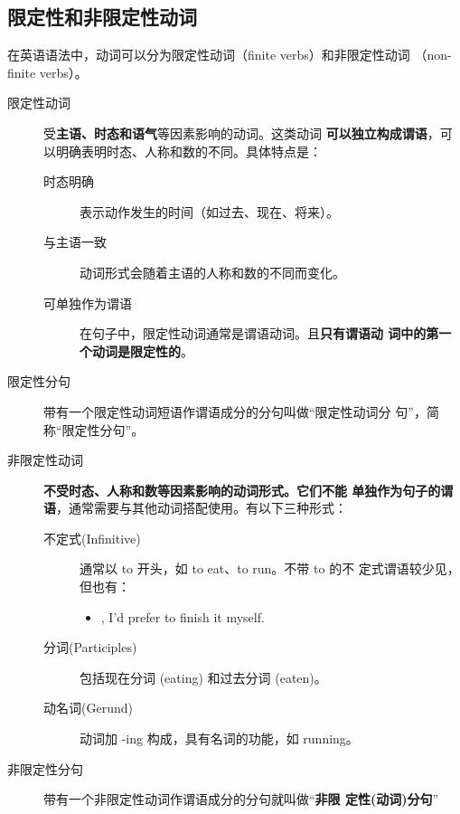 \subsection{限定性和非限定性动词}
\label{subsec:iffinite}

在英语语法中，动词可以分为限定性动词（finite verbs）和非限定性动词
（non-finite verbs）。
\begin{description}
\item[限定性动词] 受\textbf{主语、时态和语气}等因素影响的动词。这类动词
  \textbf{可以独立构成谓语}，可以明确表明时态、人称和数的不同。具体特点是：
  \begin{description}
  \item[时态明确] 表示动作发生的时间（如过去、现在、将来）。
  \item[与主语一致] 动词形式会随着主语的人称和数的不同而变化。
  \item[可单独作为谓语] 在句子中，限定性动词通常是谓语动词。且\textbf{只有谓语动
      词中的第一个动词是限定性的}。
  \end{description}

\item[限定性分句] 带有一个限定性动词短语作谓语成分的分句叫做“限定性动词分
  句”，简称“限定性分句”。

\item[非限定性动词] \textbf{不受时态、人称和数等因素影响的动词形式。它们不能
    单独作为句子的谓语}，通常需要与其他动词搭配使用。有以下三种形式：
  \begin{description}
  \item[不定式(Infinitive)] 通常以 to 开头，如 to eat、to run。不带 to 的不
    定式谓语较少见，但也有：
    \begin{itemize}
    \item {}, I'd prefer to finish it myself.
    \end{itemize}
  \item[分词(Participles)] 包括现在分词 (eating) 和过去分词 (eaten)。
  \item[动名词(Gerund)] 动词加 -ing 构成，具有名词的功能，如 running。
  \end{description}

\item[非限定性分句] 带有一个非限定性动词作谓语成分的分句就叫做“\textbf{非限
    定性(动词)分句}”
\end{description}



